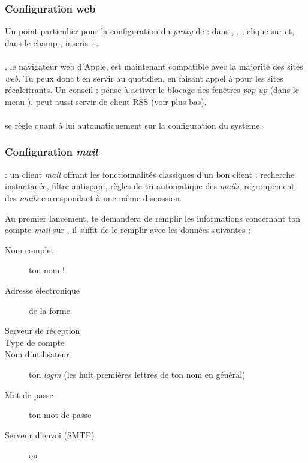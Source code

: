 \subsubsection{Configuration web}
Un point particulier pour la configuration du \emph{proxy} de  : dans , , , clique sur  et, dans le champ , inscris : . 
\\
\\

, le navigateur web d'Apple, est maintenant compatible avec la majorit\'e des sites \emph{web}. Tu peux donc t'en servir au quotidien, en faisant appel \`a   pour les sites r\'ecalcitrants. Un conseil : pense \`a  activer le blocage des fen\^etres \emph{pop-up} (dans le menu ).  peut aussi servir de client RSS (voir plus bas).\\
\\

 se règle quant à lui automatiquement sur la configuration du système. 
\\

\subsubsection{Configuration \emph{mail}}
  : un client \emph{mail} offrant les fonctionnalit\'es classiques d'un bon client : recherche instantan\'ee, filtre antispam, r\`egles de tri automatique des \emph{mails}, regroupement des \emph{mails} correspondant \`a  une m\^eme discussion.

Au premier lancement,  te demandera de remplir les informations concernant ton compte \emph{mail} sur , il suffit de le remplir avec les donn\'ees suivantes :
\begin{description}
  \item[Nom complet] ton nom !
  \item[Adresse \'electronique] de la forme 
  \item[Serveur de r\'eception] 
  \item[Type de compte] 
  \item[Nom d'utilisateur] ton \emph{login}  (les huit premi\`eres lettres de ton nom en g\'en\'eral)
  \item[Mot de passe] ton mot de passe 
  \item[Serveur d'envoi (SMTP)]  ou 
\end{description}

